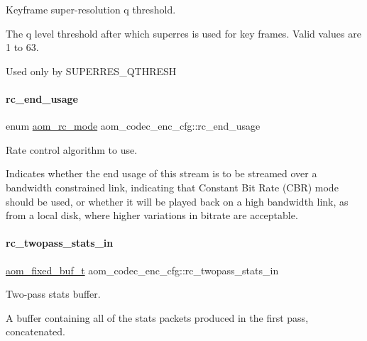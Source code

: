 Keyframe super-\/resolution q threshold. 

The q level threshold after which superres is used for key frames. Valid values are 1 to 63.

Used only by S\+U\+P\+E\+R\+R\+E\+S\+\_\+\+Q\+T\+H\+R\+E\+SH \mbox{\label{structaom__codec__enc__cfg_a3fd74d888658039d09bc4eacf163a495}} 
\paragraph{\texorpdfstring{rc\+\_\+end\+\_\+usage}{rc\_end\_usage}}
{\footnotesize\ttfamily enum \hyperlink{group__encoder_ga7c084d3ecef569aad166ce70b0e8a957}{aom\+\_\+rc\+\_\+mode} aom\+\_\+codec\+\_\+enc\+\_\+cfg\+::rc\+\_\+end\+\_\+usage}



Rate control algorithm to use. 

Indicates whether the end usage of this stream is to be streamed over a bandwidth constrained link, indicating that Constant Bit Rate (C\+BR) mode should be used, or whether it will be played back on a high bandwidth link, as from a local disk, where higher variations in bitrate are acceptable. \mbox{\label{structaom__codec__enc__cfg_ad5c6f5c96ec54cabc71edb01045a1f04}} 
\paragraph{\texorpdfstring{rc\+\_\+twopass\+\_\+stats\+\_\+in}{rc\_twopass\_stats\_in}}
{\footnotesize\ttfamily \hyperlink{group__encoder_ga85cca9fad6bc25c667f013a39c607174}{aom\+\_\+fixed\+\_\+buf\+\_\+t} aom\+\_\+codec\+\_\+enc\+\_\+cfg\+::rc\+\_\+twopass\+\_\+stats\+\_\+in}



Two-\/pass stats buffer. 

A buffer containing all of the stats packets produced in the first pass, concatenated. \mbox{\label{structaom__codec__enc__cfg_a3ccdeecb9ed287076f413f088792a4d0}} 
